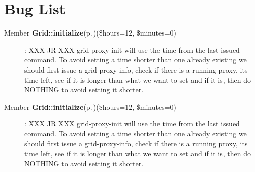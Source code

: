 \section{Bug List}\label{bug}
\label{bug__bug000002}
 \begin{description}
\item[Member {\bf Grid::initialize}{\rm (p.\,\pageref{classGrid_a37})}(\$hours=12, \$minutes=0) ]: XXX JR XXX grid-proxy-init will use the time from the last issued command. To avoid setting a time shorter than one already existing we should first issue a grid-proxy-info, check if there is a running proxy, its time left, see if it is longer than what we want to set and if it is, then do NOTHING to avoid setting it shorter. \end{description}


\label{bug__bug000001}
 \begin{description}
\item[Member {\bf Grid::initialize}{\rm (p.\,\pageref{classGrid_a11})}(\$hours=12, \$minutes=0) ]: XXX JR XXX grid-proxy-init will use the time from the last issued command. To avoid setting a time shorter than one already existing we should first issue a grid-proxy-info, check if there is a running proxy, its time left, see if it is longer than what we want to set and if it is, then do NOTHING to avoid setting it shorter. \end{description}
